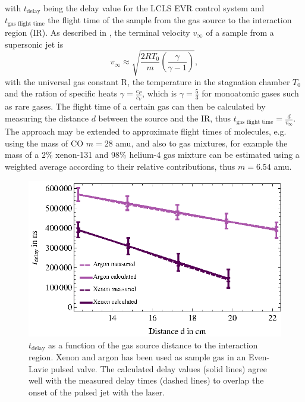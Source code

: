 with $t_{\text{delay}}$ being the delay value for the LCLS EVR control system and $t_{\text{gas flight time}}$ the flight time of the sample from the gas source to the interaction region (IR). As described in \citep{Miller-1988-Oxford}, the terminal velocity $v_{\infty}$ of a sample from a supersonic jet is
\begin{equation}
 v_{\infty} \approx \sqrt{\frac{2 R T_{0}}{m} \left(\frac{\gamma}{\gamma - 1}\right)},
\label{eqn:terminal-velocity}
\end{equation}
with the universal gas constant R, the temperature in the stagnation chamber $T_{0}$ and the ration of specific heats $\gamma = \frac{c_{P}}{c_{V}}$, which is $\gamma = \frac{5}{3}$ for monoatomic gases such as rare gases. The flight time of a certain gas can then be calculated by measuring the distance $d$ between the source and the IR, thus $t_{\text{gas flight time}}=\frac{d}{v_{\infty}}$. The approach may be extended to approximate flight times of molecules, e.g. using the mass of CO $m=28$ amu, and also to gas mixtures, for example the mass of a $2\%$ xenon-131 and $98\%$ helium-4 gas mixture can be estimated using a weighted average according to their relative contributions, thus  $m = 6.54$ amu.
\begin{figure}
	\centering
		\includegraphics[width=1.00\textwidth]{images/gas-jet-flight-times.eps}
	\caption[Event receiver time delay at LCLS for supersonic gas jets.]{$t_{\text{delay}}$ as a function of the gas source distance to the interaction region. Xenon and argon has been used as sample gas in an Even-Lavie pulsed valve. The calculated delay values (solid lines) agree well with the measured delay times (dashed lines) to overlap the onset of the pulsed jet with the laser.}
	\label{fig:LCLS-delay-data}
\end{figure}
